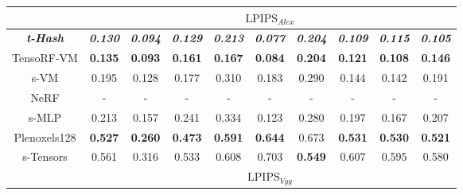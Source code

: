\documentclass[letterpaper]{article} \usepackage{aaai23}  \usepackage{times}  \usepackage{helvet}  \usepackage{courier}  \usepackage[hyphens]{url}  \usepackage{graphicx} \urlstyle{rm} \def\UrlFont{\rm}  \usepackage{natbib}  \usepackage{caption} \frenchspacing  \setlength{\pdfpagewidth}{8.5in}  \setlength{\pdfpageheight}{11in}  \usepackage{multirow}
\begin{document}
\begin{table*}[t]
{\begin{tabular}{c|ccccccccc}
                         & \multicolumn{9}{c}{$\text{LPIPS}_{Alex}$}                                                                                                                                                                                                    \\ \hline
\textit{\textbf{t-Hash}} & \textit{\textbf{0.130}} & \textit{\textbf{0.094}} & \textit{\textbf{0.129}} & \textit{\textbf{0.213}} & \textit{\textbf{0.077}} & \textit{\textbf{0.204}} & \textit{\textbf{0.109}} & \textit{\textbf{0.115}} & \textit{\textbf{0.105}} \\
TensoRF-VM               & \textbf{0.135}          & \textbf{0.093}          & \textbf{0.161}          & \textbf{0.167}          & \textbf{0.084}          & \textbf{0.204}          & \textbf{0.121}          & \textbf{0.108}          & \textbf{0.146}          \\
s-VM                     & 0.195                   & 0.128                   & 0.177                   & 0.310                   & 0.183                   & 0.290                   & 0.144                   & 0.142                   & 0.191                   \\
NeRF                     & -                       & -                       & -                       & -                       & -                       & -                       & -                       & -                       & -                       \\
s-MLP                    & 0.213                   & 0.157                   & 0.241                   & 0.334                   & 0.123                   & 0.280                   & 0.197                   & 0.167                   & 0.207                   \\
Plenoxels128             & \textbf{0.527}          & \textbf{0.260}          & \textbf{0.473}          & \textbf{0.591}          & \textbf{0.644}          & 0.673                   & \textbf{0.531}          & \textbf{0.530}          & \textbf{0.521}          \\
s-Tensors                & 0.561                   & 0.316                   & 0.533                   & 0.608                   & 0.703                   & \textbf{0.549}          & 0.607                   & 0.595                   & 0.580                   \\ \hline
                         & \multicolumn{9}{c}{$\text{LPIPS}_{Vgg}$}                                                                                                                                                                                                     \\ \hline

\end{tabular}}
\end{table*}
\end{document}
